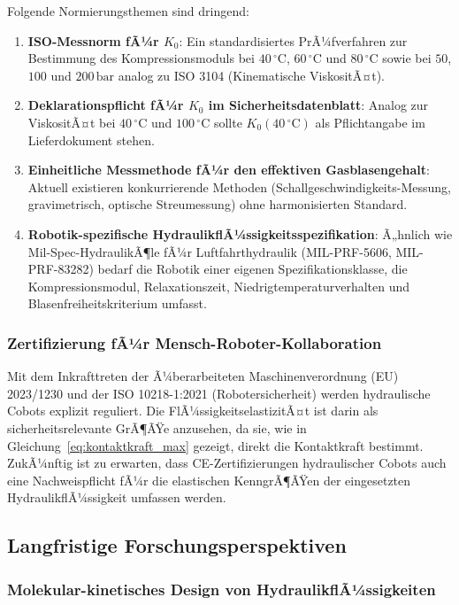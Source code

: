 ﻿\documentclass[a4paper,12pt]{scrreprt}
\theoremstyle{definition}
\begin{document}
Folgende Normierungsthemen sind dringend:
\begin{enumerate}
  \item \textbf{ISO-Messnorm fÃ¼r $K_0$}: Ein standardisiertes PrÃ¼fverfahren
    zur Bestimmung des Kompressionsmoduls bei $40\,{^\circ}\mathrm{C}$,
    $60\,{^\circ}\mathrm{C}$ und $80\,{^\circ}\mathrm{C}$ sowie bei $50$, $100$
    und $200\,\mathrm{bar}$ analog zu ISO 3104 (Kinematische ViskositÃ¤t).
  \item \textbf{Deklarationspflicht fÃ¼r $K_0$ im Sicherheitsdatenblatt}:
    Analog zur ViskositÃ¤t bei $40\,{^\circ}\mathrm{C}$ und $100\,{^\circ}\mathrm{C}$
    sollte $K_0(40\,{^\circ}\mathrm{C})$ als Pflichtangabe im Lieferdokument stehen.
  \item \textbf{Einheitliche Messmethode fÃ¼r den effektiven Gasblasengehalt}:
    Aktuell existieren konkurrierende Methoden (Schallgeschwindigkeits-Messung,
    gravimetrisch, optische Streumessung) ohne harmonisierten Standard.
  \item \textbf{Robotik-spezifische HydraulikflÃ¼ssigkeitsspezifikation}:
    Ã„hnlich wie Mil-Spec-HydraulikÃ¶le fÃ¼r Luftfahrthydraulik
    (MIL-PRF-5606, MIL-PRF-83282) bedarf die Robotik einer eigenen
    Spezifikationsklasse, die Kompressionsmodul, Relaxationszeit,
    Niedrig\-temperaturverhalten und Blasenfreiheitskriterium umfasst.
\end{enumerate}

\subsubsection{Zertifizierung fÃ¼r Mensch-Roboter-Kollaboration}

Mit dem Inkrafttreten der Ã¼berarbeiteten Maschinenverordnung
(EU) 2023/1230 und der ISO 10218-1:2021 (Robotersicherheit)
werden hydraulische Cobots explizit reguliert. Die FlÃ¼ssigkeitselastizitÃ¤t
ist darin als sicherheitsrelevante GrÃ¶ÃŸe anzusehen, da sie,
wie in Gleichung~\eqref{eq:kontaktkraft_max} gezeigt, direkt
die Kontaktkraft bestimmt. ZukÃ¼nftig ist zu erwarten, dass
CE-Zertifizierungen hydraulischer Cobots auch eine Nachweis\-pflicht
fÃ¼r die elastischen KenngrÃ¶ÃŸen der eingesetzten HydraulikflÃ¼ssig\-keit
umfassen werden.

\subsection{Langfristige Forschungsperspektiven}

\subsubsection{Molekular-kinetisches Design von HydraulikflÃ¼ssigkeiten}
\end{document}
